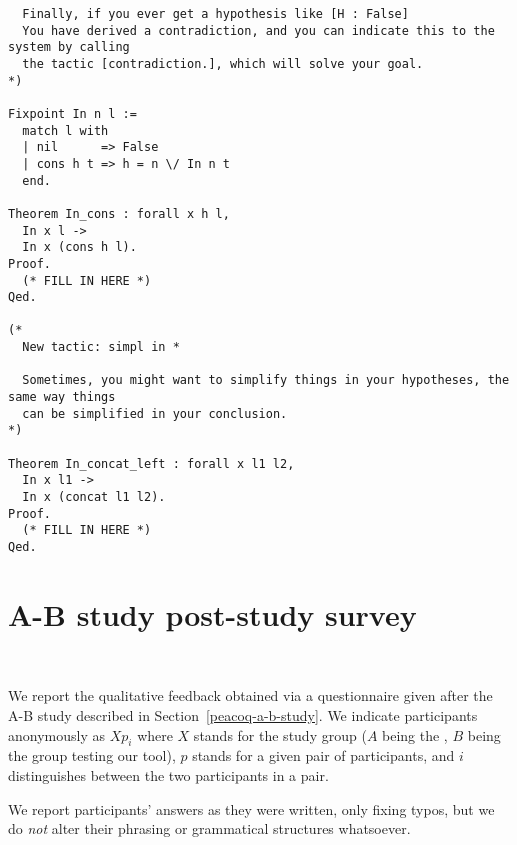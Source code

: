 \begin{verbatim}
  Finally, if you ever get a hypothesis like [H : False]
  You have derived a contradiction, and you can indicate this to the system by calling
  the tactic [contradiction.], which will solve your goal.
*)

Fixpoint In n l :=
  match l with
  | nil      => False
  | cons h t => h = n \/ In n t
  end.

Theorem In_cons : forall x h l,
  In x l ->
  In x (cons h l).
Proof.
  (* FILL IN HERE *)
Qed.

(*
  New tactic: simpl in *

  Sometimes, you might want to simplify things in your hypotheses, the same way things
  can be simplified in your conclusion.
*)

Theorem In_concat_left : forall x l1 l2,
  In x l1 ->
  In x (concat l1 l2).
Proof.
  (* FILL IN HERE *)
Qed.
\end{verbatim}

\clearpage

\section{\PeaCoq{} A-B study post-study survey}~\label{appendix-peacoq-a-b-study}

We report the qualitative feedback obtained via a questionnaire given after the
A-B study described in Section~\ref{peacoq-a-b-study}.  We indicate participants
anonymously as $Xp_{i}$ where $X$ stands for the study group ($A$ being the
, $B$ being the group testing our tool), $p$ stands for a
given pair of participants, and $i$ distinguishes between the two participants
in a pair.

We report participants' answers as they were written, only fixing typos, but we
do \emph{not} alter their phrasing or grammatical structures whatsoever.

\clearpage

